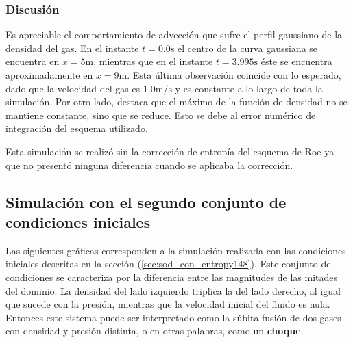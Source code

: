 \subsubsection{Discusión}
Es apreciable el comportamiento de advección que sufre el perfil gaussiano de la densidad del gas. En el instante $t=0.0\unit{\s}$ el centro de la curva gaussiana se encuentra en $x=5\unit{\meter}$, mientras que en el instante $t=3.995\unit{\s}$ éste se encuentra aproximadamente en $x=9\unit{\meter}$. Esta última observación coincide con lo esperado, dado que la velocidad del gas es $1.0\unit{\meter\per\s}$ y es constante a lo largo de toda la simulación.
Por otro lado, destaca que el máximo de la función de densidad no se mantiene constante, sino que se reduce. Esto se debe al error numérico de integración del esquema utilizado.

Esta simulación se realizó sin la corrección de entropía del esquema de Roe ya que no presentó ninguna diferencia cuando se aplicaba la corrección.
\subsection{Simulación con el segundo conjunto de condiciones iniciales}
Las siguientes gráficas corresponden a la simulación realizada con las condiciones iniciales descritas en la sección (\ref{sec:sod_con_entropy148}). Este conjunto de condiciones se caracteriza por la diferencia entre las magnitudes de las mitades del dominio. La densidad del lado izquierdo triplica la del lado derecho, al igual que sucede con la presión, mientras que la velocidad inicial del fluido es nula. Entonces este sistema puede ser interpretado como la súbita fusión de dos gases con densidad y presión distinta, o en otras palabras, como un \textbf{choque}.
